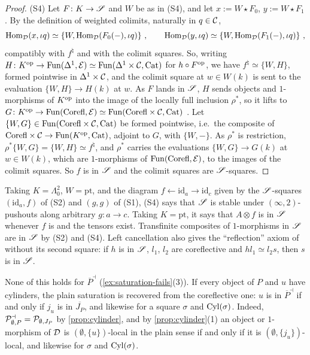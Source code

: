 \begin{proof}
(S4) Let $F\colon K \to \mathscr{S}$ and $W$ be as in (S4),
and let $x := W \star F_{0}$, $y := W \star F_{1}$.
By the definition of weighted colimits, naturally in $q \in \mathcal{C}$,
\begin{equation*}
\Hom_{\D}(x,\iota q) \simeq \{W,\Hom_{\D}(F_{0}(-),\iota q)\} \ ,
\qquad \Hom_{\D}(y,\iota q) \simeq \{W,\Hom_{\D}(F_{1}(-),\iota q)\} \ ,
\end{equation*}
compatibly with $f^{\natural}$ and with the colimit squares. So, writing
$H\colon K^{\mathrm{op}} \to \operatorname{Fun}(\Delta^{1},\mathcal{E}) \simeq \operatorname{Fun}(\Delta^{1} \times
\mathcal{C},\mathrm{Cat})$
for $h \circ F^{\mathrm{op}}$, we have
$f^{\natural} \simeq \{W,H\}$,
formed pointwise in $\Delta^{1} \times \mathcal{C}$,
and the colimit square at $w \in W(k)$ is sent to the evaluation $\{W,H\} \to
H(k)$ at $w$.
As $F$ lands in $\mathscr{S}$, $H$ sends objects and $1$-morphisms of $K^{\mathrm{op}}$ into
the image of the locally full inclusion $\rho^{*}$, so it lifts to
$G\colon K^{\mathrm{op}} \to \operatorname{Fun}(\mathrm{Corefl},\mathcal{E}) \simeq \operatorname{Fun}(\mathrm{Corefl} \times \mathcal{C},\mathrm{Cat})$
\cite[Cor.~2.6.6]{abellangagnahaugseng2024straightening}. Let
$\{W,G\} \in \operatorname{Fun}(\mathrm{Corefl} \times \mathcal{C},\mathrm{Cat})$
be formed pointwise, i.e.\ the composite of
$\mathrm{Corefl} \times \mathcal{C} \to \operatorname{Fun}(K^{\mathrm{op}},\mathrm{Cat})$,
adjoint to $G$, with $\{W,-\}$. As $\rho^{*}$ is restriction,
$\rho^{*}\{W,G\} = \{W,H\} \simeq f^{\natural}$,
and $\rho^{*}$ carries the evaluations $\{W,G\} \to G(k)$ at $w \in W(k)$,
which are $1$-morphisms of $\operatorname{Fun}(\mathrm{Corefl},\mathcal{E})$,
to the images of the colimit squares. So $f$ is in $\mathscr{S}$ and the colimit
squares are $\mathscr{S}$-squares.
\end{proof}

%
Taking $K = \Lambda^{2}_{0}$, $W = \mathrm{pt}$, and the diagram
$f \leftarrow \mathrm{id}_{a} \rightarrow \mathrm{id}_{c}$
given by the $\mathscr{S}$-squares $(\mathrm{id}_{a},f)$ of (S2) and $(g,g)$ of (S1),
(S4) says that $\mathscr{S}$ is stable under $(\infty,2)$-pushouts along arbitrary
$g\colon a \to c$. Taking $K = \mathrm{pt}$,
it says that $A \otimes f$ is in $\mathscr{S}$ whenever $f$ is and the tensors exist.
Transfinite composites of $1$-morphisms in $\mathscr{S}$ are in $\mathscr{S}$ by (S2) and
(S4).
Left cancellation also gives the ``reflection'' axiom of
\cite[Prop.~1.17(4)]{dilibertilobbiasousa2022kz} without its second square:
if $h$ is in $\mathscr{S}$, $l_{1}$, $l_{2}$ are coreflective and $hl_{1} \simeq
l_{2}s$, then $s$ is in $\mathscr{S}$.

\begin{rmk}
\label{rmk:plain-vs-refl}
%
None of this holds for
$\overline{P}^{\dashv}$
(\cref{ex:saturation-fails}(3)). If every object of $P$ and $u$ have cylinders,
the plain saturation is recovered from the coreflective one: $u$ is in
$\overline{P}^{\dashv}$
if and only if $j_{u}$ is in $\overline{J_{P}}$,
and likewise for a square $\sigma$ and $\mathrm{Cyl}(\sigma)$. Indeed,
$\mathcal{P}^{\dashv}_{\emptyset,P} = \mathcal{P}_{\emptyset,J_{P}}$
by \cref{prop:cylinder}, and by \cref{prop:cylinder}(1) an object or
$1$-morphism of $\mathcal{D}$ is $(\emptyset,\{u\})$-local in the plain sense if and only
if it is
$(\emptyset,\{j_{u}\})$-local,
and likewise for $\sigma$ and $\mathrm{Cyl}(\sigma)$.
\end{rmk}

